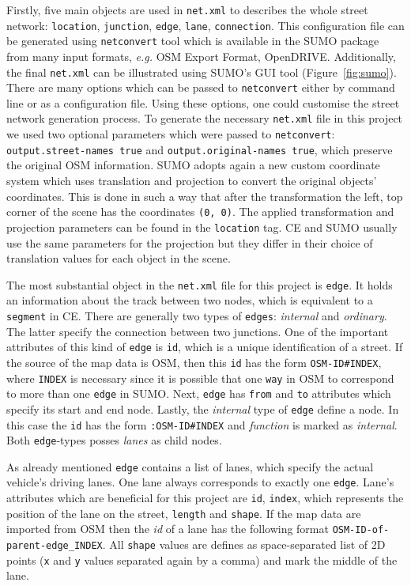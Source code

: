 Firstly, five main objects are used in \texttt{net.xml} to describes the whole street network: \texttt{location}, \texttt{junction}, \texttt{edge}, \texttt{lane}, \texttt{connection}. This configuration file can be generated using \texttt{netconvert} tool which is available in the SUMO package from many input formats, \emph{e.g.} OSM Export Format, OpenDRIVE. Additionally, the final \texttt{net.xml} can be illustrated using SUMO's GUI tool (Figure~\ref{fig:sumo}). There are many options which can be passed to \texttt{netconvert} either by command line or as a configuration file. Using these options, one could customise the street network generation process. To generate the necessary \texttt{net.xml} file in this project we used two optional parameters which were passed to \texttt{netconvert}: \texttt{output.street-names true} and \texttt{output.original-names true}, which preserve the original OSM information. SUMO adopts again a new custom coordinate system which uses translation and projection to convert the original objects' coordinates. This is done in such a way that after the transformation the left, top corner of the scene has the coordinates \texttt{(0, 0)}. The applied transformation and projection parameters can be found in the \texttt{location} tag. CE and SUMO usually use the same parameters for the  projection but they differ in their choice of translation values for each object in the scene.

The most substantial object in the \texttt{net.xml} file for this project is \texttt{edge}. It holds an information about the track between two nodes, which is equivalent to a \texttt{segment} in CE. There are generally two types of \texttt{edges}: \emph{internal} and \emph{ordinary}. The latter specify the connection between two junctions. One of the important attributes of this kind of \texttt{edge} is \texttt{id}, which is a unique identification of a street. If the source of the map data is OSM, then this \texttt{id} has the form \texttt{OSM-ID\#INDEX}, where \texttt{INDEX} is necessary since it is possible that one \texttt{way} in OSM to correspond to more than one \texttt{edge} in SUMO. Next, \texttt{edge} has \texttt{from} and \texttt{to} attributes which specify its start and end node. Lastly, the \emph{internal} type of \texttt{edge} define a node. In this case the \texttt{id} has the form \texttt{:OSM-ID\#INDEX} and \emph{function} is marked as \emph{internal}. Both \texttt{edge}-types posses \emph{lanes} as child nodes.

As already mentioned \texttt{edge} contains a list of lanes, which specify the actual vehicle's driving lanes. One lane always corresponds to exactly one \texttt{edge}. Lane's attributes which are beneficial for this project are \texttt{id}, \texttt{index}, which represents the position of the lane on the street, \texttt{length} and \texttt{shape}. If the map data are imported from OSM then the \emph{id} of a lane has the following format \texttt{OSM-ID-of-parent-edge\_INDEX}. All \texttt{shape} values are defines as space-separated list of 2D points (\texttt{x} and \texttt{y} values separated again by a comma) and mark the middle of the lane.

